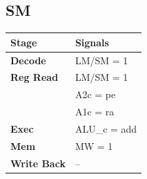 \documentclass{article}
\begin{document}
\subsection*{SM}
\begin{tabular}{|l|l|}
\hline
\textbf{Stage} & \textbf{Signals}\\
\hline
\textbf{Decode} & LM/SM = 1\\
\hline
\textbf{Reg Read} & LM/SM = 1\\
                  & A2c = pe\\
                  & A1c = ra\\
\hline
\textbf{Exec} & ALU\_c = add\\
\hline
\textbf{Mem} & MW = 1\\
\hline
\textbf{Write Back} & --\\
\hline
\end{tabular}
\end{document}
